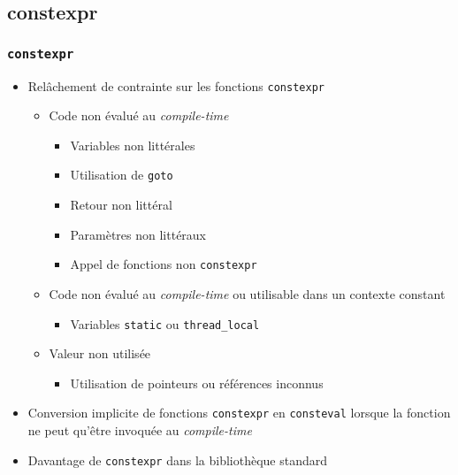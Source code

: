 \documentclass[C++.tex]{subfiles}
\begin{document}
\subsection*{constexpr}
\begin{frame}[fragile]
	\frametitle{\lstinline|constexpr|}
	\begin{itemize}
		\item Relâchement de contrainte sur les fonctions \lstinline|constexpr|
		\begin{itemize}
			\item Code non évalué au \textit{compile-time}


			\begin{itemize}
				\item Variables non littérales
				\item Utilisation de \lstinline|goto|
				\item Retour non littéral
				\item Paramètres non littéraux
				\item Appel de fonctions non \lstinline|constexpr|
			\end{itemize}

			\item Code non évalué au \textit{compile-time} ou utilisable dans un contexte constant
			\begin{itemize}
				\item Variables \lstinline|static| ou \lstinline|thread_local|

			\end{itemize}

			\item Valeur non utilisée

			\begin{itemize}
				\item Utilisation de pointeurs ou références inconnus
			\end{itemize}
		\end{itemize}

		\item Conversion implicite de fonctions \lstinline|constexpr| en \lstinline|consteval| lorsque la fonction ne peut qu'être invoquée au \textit{compile-time}
		\item Davantage de \lstinline|constexpr| dans la bibliothèque standard
	\end{itemize}
\end{frame}
\end{document}
